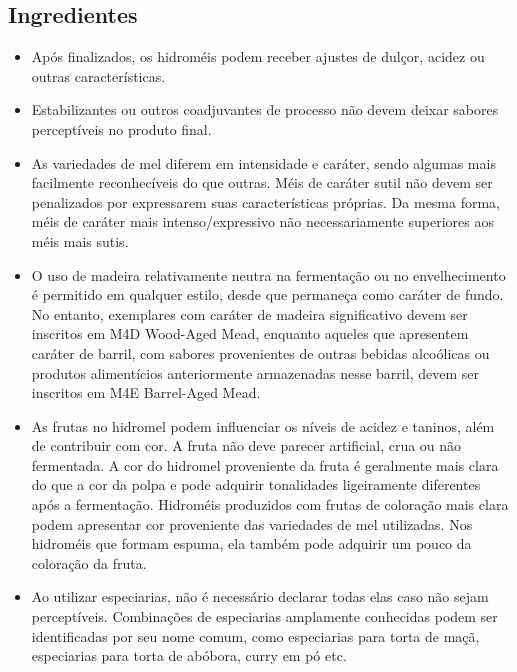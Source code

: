 
\subsection*{Ingredientes}


\begin{itemize}

\item Após finalizados, os hidroméis podem receber ajustes de dulçor, acidez ou outras características.
\item Estabilizantes ou outros coadjuvantes de processo não devem deixar sabores perceptíveis no produto final.
\item As variedades de mel diferem em intensidade e caráter, sendo algumas mais facilmente reconhecíveis do que outras. Méis de caráter sutil não devem ser penalizados por expressarem suas características próprias. Da mesma forma, méis de caráter mais intenso/expressivo não necessariamente superiores aos méis mais sutis.
\item O uso de madeira relativamente neutra na fermentação ou no envelhecimento é permitido em qualquer estilo, desde que permaneça como caráter de fundo. No entanto, exemplares com caráter de madeira significativo devem ser inscritos em M4D Wood-Aged Mead, enquanto aqueles que apresentem caráter de barril, com sabores provenientes de outras bebidas alcoólicas ou produtos alimentícios anteriormente armazenadas nesse barril, devem ser inscritos em M4E Barrel-Aged Mead.
\item As frutas no hidromel podem influenciar os níveis de acidez e taninos, além de contribuir com cor. A fruta não deve parecer artificial, crua ou não fermentada. A cor do hidromel proveniente da fruta é geralmente mais clara do que a cor da polpa e pode adquirir tonalidades ligeiramente diferentes após a fermentação. Hidroméis produzidos com frutas de coloração mais clara podem apresentar cor proveniente das variedades de mel utilizadas. Nos hidroméis que formam espuma, ela também pode adquirir um pouco da coloração da fruta.
\item Ao utilizar especiarias, não é necessário declarar todas elas caso não sejam perceptíveis. Combinações de especiarias amplamente conhecidas podem ser identificadas por seu nome comum, como especiarias para torta de maçã, especiarias para torta de abóbora, curry em pó etc.

\end{itemize}